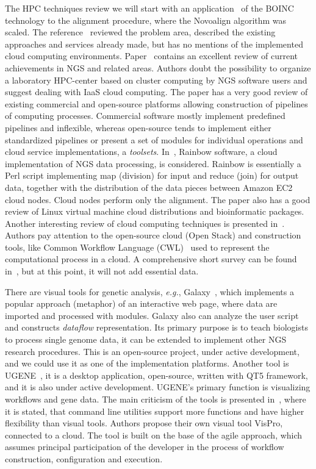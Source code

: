\documentclass[a4paper]{jpconf}
\begin{document}
The HPC techniques review we will start with an application~\cite{boinc10} of the BOINC technology to the alignment procedure, where the Novoalign algorithm was scaled. The reference~\cite{guo16} reviewed the problem area, described the existing approaches and services already made, but has no mentions of the implemented cloud computing environments.
%
Paper~\cite{kwon15} contains an excellent review of current achievements in NGS and related areas.  Authors doubt the possibility to organize a laboratory HPC-center based on cluster computing by NGS software users and suggest dealing with IaaS cloud computing.  The paper has a very good review of existing commercial and open-source platforms allowing construction of pipelines of computing processes.  Commercial software mostly implement predefined pipelines and inflexible,  whereas open-source tends to implement either standardized pipelines or present a set of modules for individual operations and cloud service implementations, a \emph{toolsets}.
%
In~\cite{zhao17}, Rainbow software, a cloud implementation of NGS data processing, is considered. Rainbow is essentially a Perl script implementing map (division) for input and reduce (join) for output data, together with the distribution of the data pieces between Amazon EC2 cloud nodes. Cloud nodes perform only the alignment.  The paper also has a good review of Linux virtual machine cloud distributions and bioinformatic packages.
Another interesting review of cloud computing techniques is presented in~\cite{lang18}. Authors pay attention to the open-source cloud (Open Stack) and construction tools, like Common Workflow Language (CWL)~\cite{cwl} used to represent the computational process in a cloud.  A comprehensive short survey can be found in~\cite{baker18}, but at this point, it will not add essential data.

There are visual tools for genetic analysis, \emph{e.g.}, Galaxy~\cite{galaxy18}, which implements a popular approach (metaphor) of an interactive web page, where data are imported and processed with modules. Galaxy also can analyze the user script and constructs \emph{dataflow} representation.  Its primary purpose is to teach biologists to process single genome data, it can be extended to implement other NGS research procedures.  This is an open-source project, under active development, and we could use it as one of the implementation platforms.  Another tool is UGENE~\cite{ugene18}, it is a desktop application, open-source, written with QT5 framework, and it is also under active development.  UGENE's primary function is visualizing workflows and gene data.  The main criticism of the tools is presented in~\cite{mill16}, where it is stated, that command line utilities support more functions and have higher flexibility than visual tools. Authors propose their own visual tool VisPro, connected to a cloud. The tool is built on the base of the agile approach, which assumes principal participation of the developer in the process of workflow construction, configuration and execution.
\end{document}

